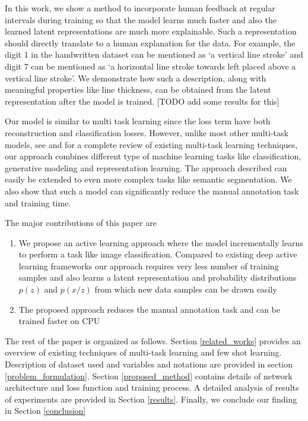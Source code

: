 \documentclass{uai2021} %
\begin{document}
In this work, we show a method to incorporate human feedback at regular intervals during training so that the model learns much faster and also the learned latent representations are much more explainable.
Such a representation should directly translate to a human explanation for the data.
For example, the digit 1 in the handwritten dataset  can be mentioned as  `a vertical line stroke'  and digit 7 can be mentioned as `a horizontal line stroke towards left placed  above a vertical line stroke'.
We demonstrate how  such a description, along with meaningful properties like line thickness, can be obtained from the latent representation after the model is trained. [TODO add some results for this]


Our model is similar to multi task learning since the loss term have both reconstruction and classification losses.
However, unlike most other multi-task models, see \cite{ruder2017overview} and \cite{crawshaw2020multi} for a complete review of existing multi-task learning techniques, our approach combines  different type of machine learning tasks like classification, generative modeling and representation learning.
The approach described can easily be extended to even more complex tasks like semantic segmentation.
We also show that such a model can significantly reduce the manual annotation task and training time.

The major contributions of this paper are
\begin{enumerate}
    \item We propose an active learning approach where the model incrementally learns to perform a task like image classification.
          Compared to existing deep active learning frameworks our approach requires very less number of training samples and also learns a latent representation and  probability distributions $p(z)$ and $p(x/z)$ from which new data samples can be drawn easily
    \item The proposed approach reduces the manual annotation task and can be trained faster on CPU
\end{enumerate}

The rest of the paper is organized as follows.
Section \ref{related_works} provides an overview of existing techniques of multi-task learning and few shot learning.
Description of dataset used and variables and notations are provided in section \ref{problem_formulation}.
Section \ref{proposed_method} contains details of network architecture and loss function and training process.
A detailed analysis of results of experiments are provided in Section \ref{results}.
Finally, we conclude our finding in Section \ref{conclusion}
\end{document}
